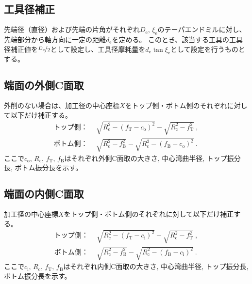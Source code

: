 \subsection{工具径補正}
先端径（直径）および先端の片角がそれぞれ$D_\mathrm e$, $\xi_\mathrm e$のテーパエンドミルに対し、先端部分から軸方向に一定の距離$d_\mathrm e$を定める。
このとき、該当する工具の工具径補正値を$\nicefrac{D_\mathrm e}2$として設定し、工具径摩耗量を$d_\mathrm e\tan\xi_\mathrm e$として設定を行うものとする。


\subsection{端面の外側C面取}
外削のない場合は、加工径の中心座標$X$をトップ側・ボトム側のそれぞれに対して以下だけ補正する。
\begin{align*}
  \text{トップ側：}&~~
  \sqrt{R_\mathrm c^2-\left(f_\mathrm T-c_\mathrm o\right)^2}-\sqrt{R_\mathrm c^2-f_\mathrm T^2}\ ,\\
  \text{ボトム側：}&~~
  \sqrt{R_\mathrm c^2-f_\mathrm B^2}-\sqrt{R_\mathrm c^2-\left(f_\mathrm B-c_\mathrm o\right)^2}\ .
\end{align*}
ここで$c_\mathrm o$, $R_\mathrm c$, $f_\mathrm T$, $f_\mathrm B$はそれぞれ外側C面取の大きさ, 中心湾曲半径, トップ振分長, ボトム振分長を示す。


\subsection{端面の内側C面取}
加工径の中心座標$X$をトップ側・ボトム側のそれぞれに対して以下だけ補正する。
\begin{align*}
  \text{トップ側：}&~~
  \sqrt{R_\mathrm c^2-\left(f_\mathrm T-c_\mathrm i\right)^2}-\sqrt{R_\mathrm c^2-f_\mathrm T^2}\ ,\\
  \text{ボトム側：}&~~
  \sqrt{R_\mathrm c^2-f_\mathrm B^2}-\sqrt{R_\mathrm c^2-\left(f_\mathrm B-c_\mathrm i\right)^2}\ .
\end{align*}
ここで$c_\mathrm i$, $R_\mathrm c$, $f_\mathrm T$, $f_\mathrm B$はそれぞれ内側C面取の大きさ, 中心湾曲半径, トップ振分長, ボトム振分長を示す。


